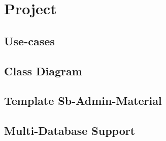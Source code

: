 \chapter{Project}

\section{Use-cases}
\section{Class Diagram}
\section{Template Sb-Admin-Material}
\section{Multi-Database Support}

